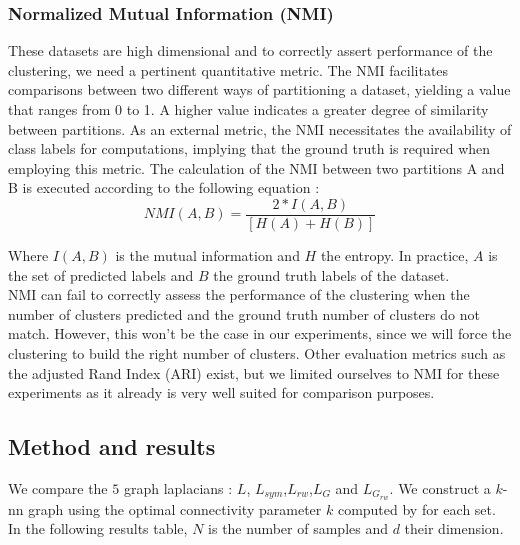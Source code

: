 \documentclass[a4paper,12pt]{article}
\theoremstyle{definition}
\theoremstyle{plain}
\begin{document}
\subsubsection{Normalized Mutual Information (NMI)}
These datasets are high dimensional and to correctly assert performance of the clustering, we need a pertinent quantitative metric.
The NMI facilitates comparisons between two different ways of partitioning a dataset, yielding a value that ranges from 0 to 1. A higher value indicates a greater degree of similarity between partitions. As an external metric, the NMI necessitates the availability of class labels for computations, implying that the ground truth is required when employing this metric.
The calculation of the NMI between two partitions A and B is executed according to the following equation :
$$NMI\left(A,B\right)=\frac{2*I(A,B)}{[H\left(A\right)+H(B)]}$$

Where $I(A,B)$ is the mutual information and $H$ the entropy. 
In practice, $A$ is the set of predicted labels and $B$ the ground truth labels of the dataset. \\ NMI can fail to correctly assess the performance of the clustering when the number of clusters predicted and the ground truth number of clusters do not match. However, this won't be the case in our experiments, since we will force the clustering to build the right number of clusters.
Other evaluation metrics such as the adjusted Rand Index (ARI) exist, but we limited ourselves to NMI for these experiments as it already is very well suited for comparison purposes.
\subsection{Method and results}
We compare the $5$ graph laplacians : $L$, $L_{sym}$,$L_{rw}$,$L_{G}$ and $L_{G_{rw}} $. We construct a $k$-nn graph using the optimal connectivity parameter $k$ computed by \cite[Jonckheere et.al]{GSC} for each set. In the following results table, $N$ is the number of samples and $d$ their dimension.
\end{document}
